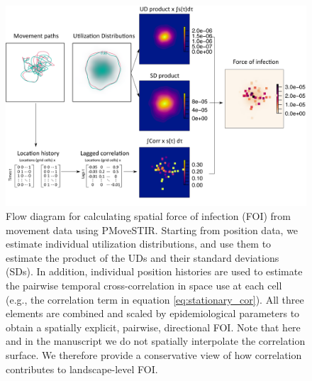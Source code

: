 ﻿\documentclass[11pt]{article}
\begin{document}
 \begin{figure}
     \includegraphics[width=\textwidth]{figures/steps_diagram.png}
     \caption{Flow diagram for calculating spatial force of infection (FOI) from movement data using PMoveSTIR. Starting from position data, we estimate individual utilization distributions, and use them to estimate the product of the UDs and their standard deviations (SDs). In addition, individual position histories are used to estimate the pairwise temporal cross-correlation in space use at each cell (e.g., the correlation term in equation \ref{eq:stationary_cor}). All three elements are combined and scaled by epidemiological parameters to obtain a spatially explicit, pairwise, directional FOI. Note that here and in the manuscript we do not spatially interpolate the correlation surface. We therefore provide a conservative view of how correlation contributes to landscape-level FOI.}
  \label{fig:steps}
 \end{figure}
\end{document}
